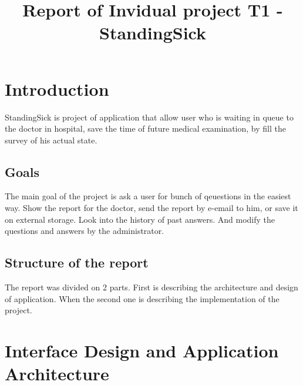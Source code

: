 \documentclass[conference]{IEEEtran}
\begin{document}
%
\title{Report of Invidual project T1 - StandingSick}


\author{
}



\maketitle


\IEEEpeerreviewmaketitle



\section{Introduction}
StandingSick is project of application that allow user who
is waiting in queue to the doctor in hospital, save the time
of future medical examination, by fill the survey of his actual state.


\subsection{Goals}
The main goal of the project is ask a user for bunch of qeuestions
in the easiest way. Show the report for the doctor, send
the report by e-email to him, or save it on external storage. 
Look into the history of past answers. And modify the questions 
and answers by the administrator.

\subsection{Structure of the report}
The report was divided on 2 parts. First is describing the architecture
and design of application. When the second one is describing the 
implementation of the project.


\section{Interface Design and Application Architecture}
\end{document}
